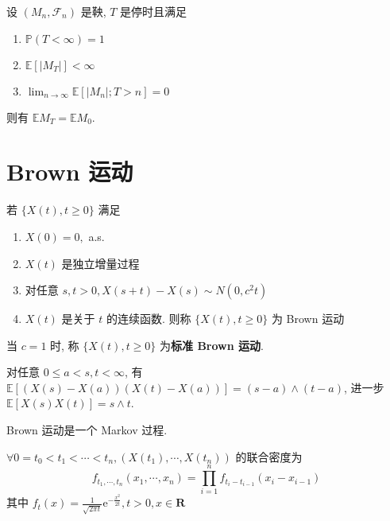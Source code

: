 \documentclass[10pt]{yerbaformat}
\begin{document}
\begin{theorem}[停止定理]
    设 $\left(M_{n}, \mathcal{F}_{n}\right)$ 是鞅, $T$ 是停时且满足
    \begin{enumerate}
        \item $\mathbb{P}(T<\infty)=1$
        \item $\mathbb{E}\left[\left|M_{T}\right|\right]<\infty$
        \item $\lim _{n \rightarrow \infty} \mathbb{E}\left[\left|M_{n}\right| ; T>n\right]=0$
    \end{enumerate}
    则有 $\mathbb{E} M_{T}=\mathbb{E} M_{0}$.
\end{theorem}

\section{Brown 运动}

\begin{definition}
    若 $\{X(t), t \geq 0\}$ 满足
    \begin{enumerate}
        \item $X(0)=0,$ a.s.
        \item $X(t)$ 是独立增量过程
        \item 对任意 $s, t>0, X(s+t)-X(s) \sim N\left(0, c^{2} t\right)$
        \item $X(t)$ 是关于 $t$ 的连续函数. 则称 $\{X(t), t \geq 0\}$ 为 Brown 运动
    \end{enumerate}
    当 $c=1$ 时, 称 $\{X(t), t \geq 0\}$ 为\textbf{标准 Brown 运动}.
\end{definition}

\begin{theorem}
    对任意 $0 \leq a<s, t<\infty$, 有$\mathbb{E}[(X(s)-X(a))(X(t)-X(a))]=(s-a) \wedge(t-a)$, 进一步 $\mathbb{E}[X(s) X(t)]=s \wedge t$.
\end{theorem}

\begin{theorem}
    Brown 运动是一个 Markov 过程.
\end{theorem}

\begin{theorem}[有限维分布]
    $\forall 0=t_{0}<t_{1}<\cdots<t_{n},\left(X\left(t_{1}\right), \cdots, X\left(t_{n}\right)\right)$ 的联合密度为 $$f_{t_{1}, \cdots, t_{n}}\left(x_{1}, \cdots, x_{n}\right)=\prod_{i=1}^{n} f_{t_{i}-t_{i-1}}\left(x_{i}-x_{i-1}\right)$$ 其中 $f_{t}(x)=\frac{1}{\sqrt{2 \pi t}} \mathrm{e}^{-\frac{x^{2}}{2 t}}, t>0, x \in \mathbf{R}$
\end{theorem}
\end{document}
